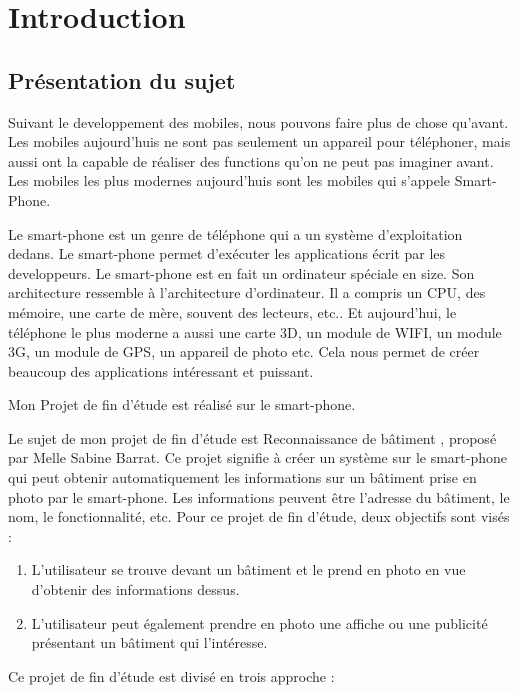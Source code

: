 ﻿\section{Introduction}

\subsection{Présentation du sujet} %
\label{sub:présentation_du_sujet}


Suivant le developpement des mobiles, nous pouvons faire plus de chose qu'avant. Les mobiles aujourd'huis ne sont pas seulement un appareil pour téléphoner, mais aussi ont la capable de réaliser des functions qu'on ne peut pas imaginer avant. Les mobiles les plus modernes aujourd'huis sont les mobiles qui s'appele Smart-Phone. 

Le smart-phone est un genre de téléphone qui a un système d'exploitation dedans. Le smart-phone permet d'exécuter les applications écrit par les developpeurs. Le smart-phone est en fait un ordinateur spéciale en size. Son architecture ressemble à l'architecture d'ordinateur. Il a compris un CPU, des mémoire, une carte de mère, souvent des lecteurs, etc.. Et aujourd'hui, le téléphone le plus moderne a aussi une carte 3D, un module de WIFI, un module 3G, un module de GPS, un appareil de photo etc. Cela nous permet de créer beaucoup des applications intéressant et puissant. 

Mon Projet de fin d'étude est réalisé sur le smart-phone. 

Le sujet de mon projet de fin d'étude est \guillemotleft Reconnaissance de bâtiment \guillemotright, proposé par Melle Sabine Barrat. Ce projet signifie à créer un système sur le smart-phone qui peut obtenir automatiquement les informations sur un bâtiment prise en photo par le smart-phone. Les informations peuvent être l'adresse du bâtiment, le nom, le fonctionnalité, etc. Pour ce projet de fin d'étude, deux objectifs sont visés : 
\begin{enumerate}
	\item L’utilisateur se trouve devant un bâtiment et le prend en photo en vue d’obtenir des informations dessus. 
	\item L’utilisateur peut également prendre en photo une affiche ou une publicité présentant un bâtiment qui l’intéresse.
\end{enumerate}

Ce projet de fin d'étude est divisé en trois approche :

